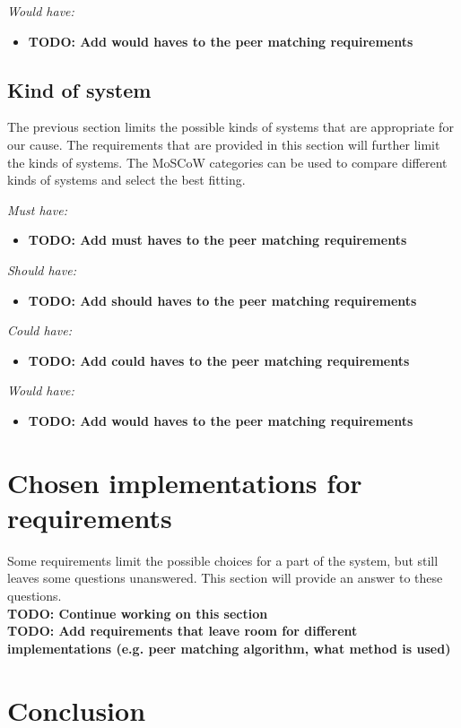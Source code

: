 \documentclass[]{article}
\newcommand{\TODO}[1]{{\color{red}\textbf{TODO: #1}}}
\begin{document}
\emph{Would have:}
\begin{itemize}
\item \TODO{Add would haves to the peer matching requirements}
\end{itemize}

\subsection{Kind of system}
The previous section limits the possible kinds of systems that are appropriate for our cause.
The requirements that are provided in this section will further limit the kinds of systems.
The MoSCoW categories can be used to compare different kinds of systems and select the best fitting.

\emph{Must have:}
\begin{itemize}
\item \TODO{Add must haves to the peer matching requirements}
\end{itemize}

\emph{Should have:}
\begin{itemize}
\item \TODO{Add should haves to the peer matching requirements}
\end{itemize}

\emph{Could have:}
\begin{itemize}
\item \TODO{Add could haves to the peer matching requirements}
\end{itemize}

\emph{Would have:}
\begin{itemize}
\item \TODO{Add would haves to the peer matching requirements}
\end{itemize}

\section{Chosen implementations for requirements}
Some requirements limit the possible choices for a part of the system, but still leaves some questions unanswered. This section will provide an answer to these questions.\\
\TODO{Continue working on this section}\\
\TODO{Add requirements that leave room for different implementations (e.g. peer matching algorithm, what method is used)}

\section{Conclusion}

\newpage


\end{document}
